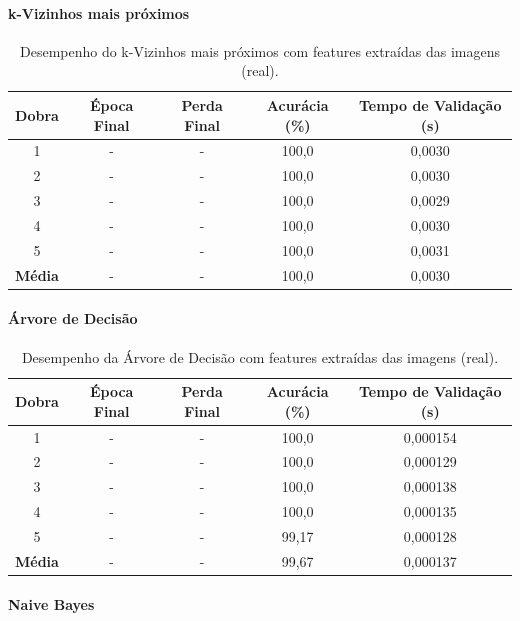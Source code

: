 \paragraph{k-Vizinhos mais próximos}

\begin{table}[H]
\caption{Desempenho do k-Vizinhos mais próximos com features extraídas das imagens (real).}
\centering
\begin{tabular}{ccccc}
\hline
\textbf{Dobra} & \textbf{Época Final} & \textbf{Perda Final} & \textbf{Acurácia (\%)} & \textbf{Tempo de Validação (s)}  \\
\hline
1 & - & - & 100,0 & 0,0030 \\
2 & - & - & 100,0 & 0,0030 \\
3 & - & - & 100,0 & 0,0029 \\
4 & - & - & 100,0 & 0,0030 \\
5 & - & - & 100,0 & 0,0031 \\
\hline
\textbf{Média} & - & - & 100,0 & 0,0030 \\
\hline
\end{tabular}
\fonte{}
\label{tab:knn_features_imagens}
\end{table} 

\paragraph{Árvore de Decisão}

\begin{table}[H]
\caption{Desempenho da Árvore de Decisão com features extraídas das imagens (real).}
\centering
\begin{tabular}{ccccc}
\hline
\textbf{Dobra} & \textbf{Época Final} & \textbf{Perda Final} & \textbf{Acurácia (\%)} & \textbf{Tempo de Validação (s)}  \\
\hline
1 & - & - & 100,0 & 0,000154 \\
2 & - & - & 100,0 & 0,000129 \\
3 & - & - & 100,0 & 0,000138 \\
4 & - & - & 100,0 & 0,000135 \\
5 & - & - & 99,17 & 0,000128 \\
\hline
\textbf{Média} & - & - & 99,67 & 0,000137 \\
\hline
\end{tabular}
\fonte{}
\label{tab:arvore_features_imagens}
\end{table}

\paragraph{Naive Bayes}

